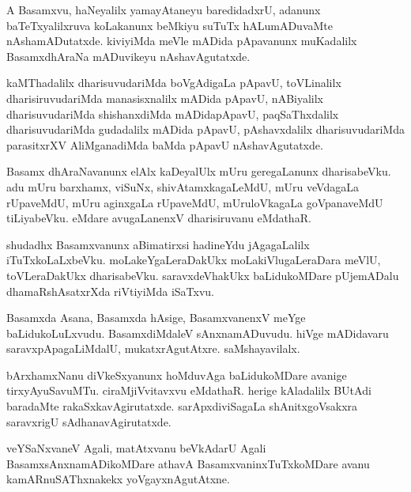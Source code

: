 \documentclass{article}
\begin{document}
\begin{mn}
A  Basamxvu,  haNeyalilx  yamayAtaneyu  baredidadxrU,  adanunx  baTeTxyalilxruva  koLakanunx  beMkiyu  
suTuTx  hALumADuvaMte  nAshamADutatxde.  kiviyiMda  meVle  mADida  pApavanunx  muKadalilx  BasamxdhAraNa  
mADuvikeyu  nAshavAgutatxde.
\end{mn}

\begin{mn}
kaMThadalilx  dharisuvudariMda  boVgAdigaLa  pApavU,  toVLinalilx  dharisiruvudariMda  manasisxnalilx  mADida  
pApavU,  nABiyalilx  dharisuvudariMda  shishanxdiMda  mADidapApavU,  paqSaThxdalilx  dharisuvudariMda  
gudadalilx  mADida  pApavU,  pAshavxdalilx  dharisuvudariMda  parasitxrXV  AliMganadiMda  baMda  pApavU  nAshavAgutatxde.
\end{mn}

\begin{mn}
Basamx  dhAraNavanunx  elAlx  kaDeyalUlx  mUru  geregaLanunx  dharisabeVku.  adu  mUru  barxhamx,  viSuNx,  
shivAtamxkagaLeMdU,  mUru  veVdagaLa  rUpaveMdU,  mUru  aginxgaLa  rUpaveMdU,  mUruloVkagaLa  goVpanaveMdU  
tiLiyabeVku.  eMdare  avugaLanenxV  dharisiruvanu  eMdathaR.
\end{mn}

\begin{mn}
shudadhx Basamxvanunx aBimatirxsi  hadineYdu  jAgagaLalilx  iTuTxkoLaLxbeVku.  moLakeYgaLeraDakUkx  
moLakiVlugaLeraDara  meVlU,  toVLeraDakUkx  dharisabeVku.  saravxdeVhakUkx  baLidukoMDare  pUjemADalu  
dhamaRshAsatxrXda  riVtiyiMda  iSaTxvu.
\end{mn}

\begin{mn}
Basamxda  Asana,  Basamxda  hAsige,  BasamxvanenxV  meYge  baLidukoLuLxvudu.  BasamxdiMdaleV  sAnxnamADuvudu.  
hiVge  mADidavaru  saravxpApagaLiMdalU,  mukatxrAgutAtxre.  saMshayavilalx.
\end{mn}

\begin{mn}
bArxhamxNanu  diVkeSxyanunx  hoMduvAga  baLidukoMDare  avanige  tirxyAyuSavuMTu.  ciraMjiVvitavxvu  eMdathaR.  herige  
kAladalilx  BUtAdi  baradaMte  rakaSxkavAgirutatxde.  sarApxdiviSagaLa  shAnitxgoVsakxra  saravxrigU  sAdhanavAgirutatxde.
\end{mn}

\begin{mn}
veYSaNxvaneV  Agali,  matAtxvanu  beVkAdarU  Agali  BasamxsAnxnamADikoMDare  athavA  BasamxvaninxTuTxkoMDare  
avanu  kamARnuSAThxnakekx  yoVgayxnAgutAtxne.
\end{mn}
\end{document}
